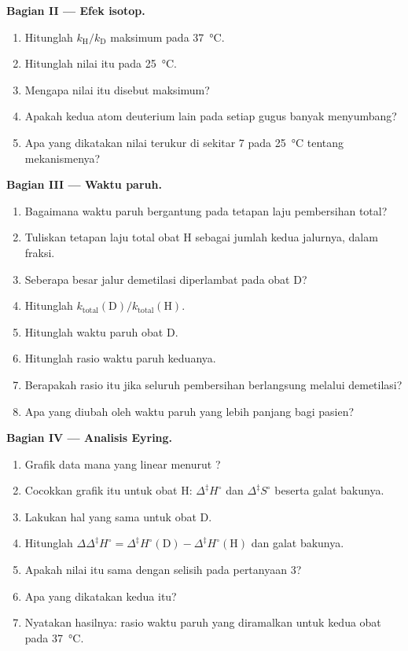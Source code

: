 \begin{problem}
\medskip\noindent\textbf{Bagian II --- Efek isotop.}
\begin{enumerate}[resume, beginpenalty=10000]
  \item Hitunglah $k_{\mathrm H}/k_{\mathrm D}$ maksimum pada \qty{37}{\celsius}.
  \item Hitunglah nilai itu pada \qty{25}{\celsius}.
  \item Mengapa nilai itu disebut maksimum?
  \item Apakah kedua atom deuterium lain pada setiap gugus  banyak
        menyumbang?
  \item Apa yang dikatakan nilai terukur di sekitar 7 pada \qty{25}{\celsius}
        tentang mekanismenya?
\end{enumerate}

\medskip\noindent\textbf{Bagian III --- Waktu paruh.}
\begin{enumerate}[resume, beginpenalty=10000]
  \item Bagaimana waktu paruh bergantung pada tetapan laju pembersihan total?
  \item Tuliskan tetapan laju total obat H sebagai jumlah kedua jalurnya,
        dalam fraksi.
  \item Seberapa besar jalur demetilasi diperlambat pada obat D?
  \item Hitunglah $k_{\mathrm{total}}(\mathrm D)/k_{\mathrm{total}}(\mathrm H)$.
  \item Hitunglah waktu paruh obat D.
  \item Hitunglah rasio waktu paruh keduanya.
  \item Berapakah rasio itu jika seluruh pembersihan berlangsung melalui
        demetilasi?
  \item Apa yang diubah oleh waktu paruh yang lebih panjang bagi pasien?
\end{enumerate}

\medskip\noindent\textbf{Bagian IV --- Analisis Eyring.}
\begin{enumerate}[resume, beginpenalty=10000]
  \item Grafik data mana yang linear menurut ?
  \item Cocokkan grafik itu untuk obat H: $\Delta^{\ddagger}H^\circ$ dan
        $\Delta^{\ddagger}S^\circ$ beserta galat bakunya.
  \item Lakukan hal yang sama untuk obat D.
  \item Hitunglah $\Delta\Delta^{\ddagger}H^\circ = \Delta^{\ddagger}H^\circ(\mathrm D) - \Delta^{\ddagger}H^\circ(\mathrm H)$
        dan galat bakunya.
  \item Apakah nilai itu sama dengan selisih  pada pertanyaan 3?
  \item Apa yang dikatakan kedua  itu?
  \item Nyatakan hasilnya: rasio waktu paruh yang diramalkan untuk kedua obat
        pada \qty{37}{\celsius}.
\end{enumerate}
\end{problem}
